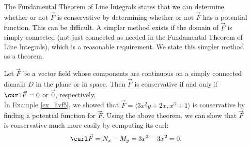 The Fundamental Theorem of Line Integrals states that we can determine whether or not $\vec F$ is conservative by determining whether or not $\vec F$ has a potential function. This can be difficult. A simpler method exists if the domain of $\vec F$ is simply connected (not just connected as needed in the Fundamental Theorem of Line Integrals), which is a reasonable requirement. We state this simpler method as a theorem.

{Let $\vec F$ be a vector field whose components are continuous on a simply connected domain $D$ in the plane or in space. Then $\vec F$ is conservative if and only if $\curl \vec F = 0$ or $\vec 0$, respectively.
}\\

In Example \ref{ex_livf5}, we showed that $\vec F =\langle 3x^2y+2x,x^3+1\rangle$ is conservative by finding a potential function for $\vec F$. Using the above theorem, we can show that $\vec F$ is conservative much more easily by computing its curl:
\[
\curl \vec F = N_x - M_y = 3x^2 - 3x^2 = 0.
\]

%
